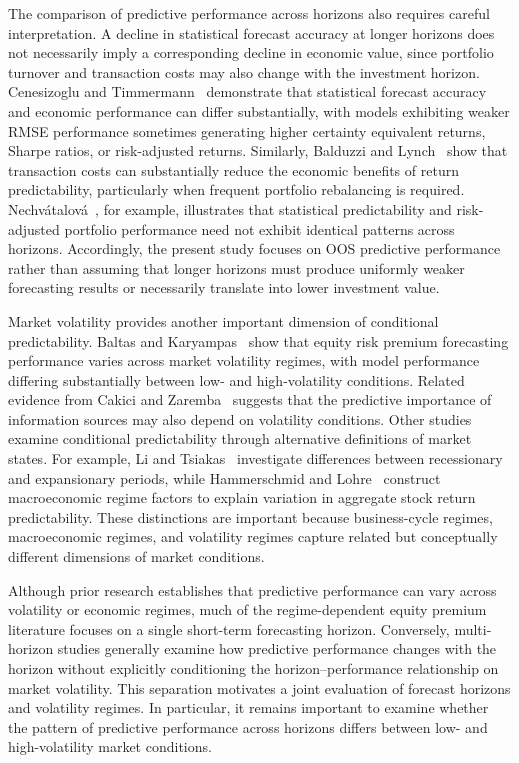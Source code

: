 \documentclass[runningheads,orivec]{llncs}
\begin{document}
The comparison of predictive performance across horizons also requires careful interpretation. A decline in statistical forecast accuracy at longer horizons does not necessarily imply a corresponding decline in economic value, since portfolio turnover and transaction costs may also change with the investment horizon. Cenesizoglu and Timmermann~\cite{cenesizoglu2012} demonstrate that statistical forecast accuracy and economic performance can differ substantially, with models exhibiting weaker RMSE performance sometimes generating higher certainty equivalent returns, Sharpe ratios, or risk-adjusted returns. Similarly, Balduzzi and Lynch~\cite{balduzzi1999} show that transaction costs can substantially reduce the economic benefits of return predictability, particularly when frequent portfolio rebalancing is required. Nechv{\'a}talov{\'a}~\cite{nechvatalova2024}, for example, illustrates that statistical predictability and risk-adjusted portfolio performance need not exhibit identical patterns across horizons. Accordingly, the present study focuses on OOS predictive performance rather than assuming that longer horizons must produce uniformly weaker forecasting results or necessarily translate into lower investment value.

Market volatility provides another important dimension of conditional predictability. Baltas and Karyampas~\cite{baltas2018} show that equity risk premium forecasting performance varies across market volatility regimes, with model performance differing substantially between low- and high-volatility conditions. Related evidence from Cakici and Zaremba~\cite{cakici2025} suggests that the predictive importance of information sources may also depend on volatility conditions. Other studies examine conditional predictability through alternative definitions of market states. For example, Li and Tsiakas~\cite{li2017} investigate differences between recessionary and expansionary periods, while Hammerschmid and Lohre~\cite{hammerschmid2018} construct macroeconomic regime factors to explain variation in aggregate stock return predictability. These distinctions are important because business-cycle regimes, macroeconomic regimes, and volatility regimes capture related but conceptually different dimensions of market conditions.

Although prior research establishes that predictive performance can vary across volatility or economic regimes, much of the regime-dependent equity premium literature focuses on a single short-term forecasting horizon. Conversely, multi-horizon studies generally examine how predictive performance changes with the horizon without explicitly conditioning the horizon--performance relationship on market volatility. This separation motivates a joint evaluation of forecast horizons and volatility regimes. In particular, it remains important to examine whether the pattern of predictive performance across horizons differs between low- and high-volatility market conditions.
\end{document}
